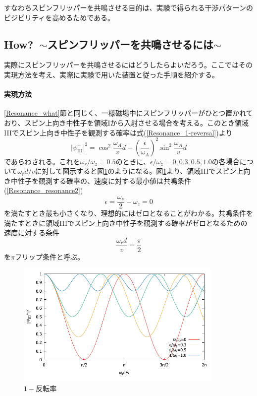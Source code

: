 すなわちスピンフリッパーを共鳴させる目的は、実験で得られる干渉パターンのビジビリティを高めるためである。

\clearpage
\subsection{How?\ $\sim$スピンフリッパーを共鳴させるには$\sim$}
実際にスピンフリッパーを共鳴させるにはどうしたらよいだろう。ここではその実現方法を考え、実際に実験で用いた装置と従った手順を紹介する。

\paragraph{実現方法}
\ref{Resonance_what}節と同じく、一様磁場中にスピンフリッパーがひとつ置かれており、スピン上向き中性子を領域Iから入射させる場合を考える。このとき領域IIIでスピン上向き中性子を観測する確率は式(\ref{Resonance_1-reversal})より
\begin{equation}
\bigl|\psi_\mathrm{III}^+\bigr|^2 =\cos^2 \frac{\omega_A}{v}d+\left(\frac{\epsilon}{\omega_A}\right)^2\sin^2\frac{\omega_A}{v}d
\end{equation}
であらわされる。これを$\omega_r/\omega_z=0.5$のときに、$\epsilon/\omega_z=0,0.3,0.5,1.0$の各場合について$\omega_r d/v$に対して図示すると図\ref{Resonance_fig_1-reversal}のようになる。図\ref{Resonance_fig_1-reversal}より、領域IIIでスピン上向き中性子を観測する確率の、速度に対する最小値は共鳴条件(\ref{Resonance_resonance2})
\[
\epsilon=\frac{\omega_s}{2}-\omega_z=0
\]
を満たすとき最も小さくなり、理想的にはゼロとなることがわかる。共鳴条件を満たすときに領域IIIでスピン上向き中性子を観測する確率がゼロとなるための速度に対する条件
\begin{equation}
\frac{\omega_rd}{v}=\frac{\pi}{2}
\end{equation}
を$\pi$フリップ条件と呼ぶ。
\begin{figure}[h]
\begin{center}
\includegraphics[width=10cm]{resonance/whatwhyhow/resonance_1-reversal.pdf}
\caption{$1-反転率$}
\label{Resonance_fig_1-reversal}
\end{center}
\end{figure}

